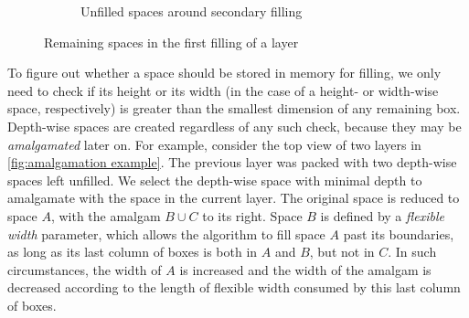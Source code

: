 \begin{figure}[h]
\begin{subfigure}{.45\textwidth}
        \caption{Unfilled spaces around secondary filling}
        \label{fig:remaining spaces first filling WBH B}
    \end{subfigure}
    \caption{Remaining spaces in the first filling of a layer}
    \label{fig:remaining spaces first filling WBH}
\end{figure}

To figure out whether a space should be stored in memory for filling, we only need to check if its height or its width (in the case of a height- or width-wise space, respectively) is greater than the smallest dimension of any remaining box. Depth-wise spaces are created regardless of any such check, because they may be \emph{amalgamated} later on. For example, consider the top view of two layers in \cref{fig:amalgamation example}. The previous layer was packed with two depth-wise spaces left unfilled. We select the depth-wise space with minimal depth to amalgamate with the space in the current layer. The original space is reduced to space $A$, with the amalgam $B \cup C$ to its right. Space $B$ is defined by a \emph{flexible width} parameter, which allows the algorithm to fill space $A$ past its boundaries, as long as its last column of boxes is both in $A$ and $B$, but not in $C$. In such circumstances, the width of $A$ is increased and the width of the amalgam is decreased according to the length of flexible width consumed by this last column of boxes.

